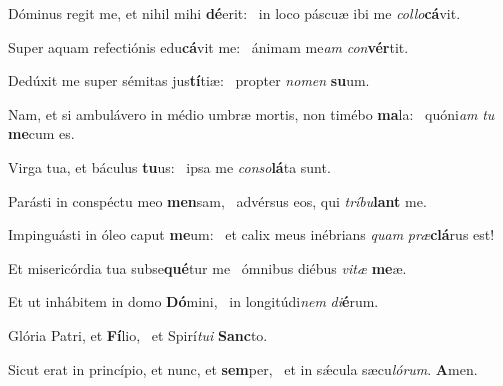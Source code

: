 \item Dóminus regit me, et nihil mihi \textbf{dé}erit:~\psstar{} in loco páscuæ ibi me \textit{collo}\textbf{cá}vit.
\item Super aquam refectiónis edu\textbf{cá}vit me:~\psstar{} ánimam me\textit{am} \textit{con}\textbf{vér}tit.
\item Dedúxit me super sémitas jus\textbf{tí}tiæ:~\psstar{} propter \textit{nomen} \textbf{su}um.
\item Nam, et si ambulávero in médio umbræ mortis, non timébo \textbf{ma}la:~\psstar{} quóni\textit{am} \textit{tu} \textbf{me}cum es.
\item Virga tua, et báculus \textbf{tu}us:~\psstar{} ipsa me \textit{conso}\textbf{lá}ta sunt.
\item Parásti in conspéctu meo \textbf{men}sam,~\psstar{} advérsus eos, qui \textit{tríbu}\textbf{lant} me.
\item Impinguásti in óleo caput \textbf{me}um:~\psstar{} et calix meus inébrians \textit{quam} \textit{præ}\textbf{clá}rus est!
\item Et misericórdia tua subse\textbf{qué}\-tur me~\psstar{} ómnibus diébus \textit{vitæ} \textbf{me}æ.
\item Et ut inhábitem in domo \textbf{Dó}mini,~\psstar{} in longitúdi\textit{nem} \textit{di}\textbf{é}rum.
\item Glória Patri, et \textbf{Fí}lio,~\psstar{} et Spirí\textit{tui} \textbf{Sanc}to.
\item Sicut erat in princípio, et nunc, et \textbf{sem}per,~\psstar{} et in sǽcula sæcu\textit{lórum}. \textbf{A}men.
